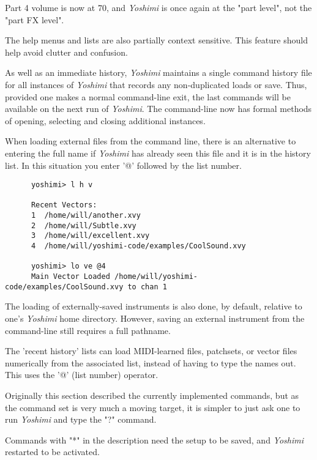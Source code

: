    Part 4 volume is now at 70, and \textsl{Yoshimi} is once again at the
   "part level", not the "part FX level".

   The help menus and lists are also partially context sensitive. This
   feature should help avoid clutter and confusion.

   As well as an immediate history, \textsl{Yoshimi} maintains a single command
   history file for all instances of \textsl{Yoshimi} that records any
   non-duplicated loads or save.  Thus, provided one makes a normal
   command-line exit, the last commands will be available on the next run of
   \textsl{Yoshimi}.
   The command-line now has formal methods of opening, selecting and closing
   additional instances.

   When loading external files from the command line, there is an alternative
   to entering the full name if \textsl{Yoshimi} has already seen this file and
   it is in the history list. In this situation you enter '@' followed by the
   list number.

   \begin{verbatim}
      yoshimi> l h v

      Recent Vectors:
      1  /home/will/another.xvy
      2  /home/will/Subtle.xvy
      3  /home/will/excellent.xvy
      4  /home/will/yoshimi-code/examples/CoolSound.xvy

      yoshimi> lo ve @4
      Main Vector Loaded /home/will/yoshimi-code/examples/CoolSound.xvy to chan 1
   \end{verbatim}

   The loading of externally-saved instruments is also done, by default,
   relative to one's \textsl{Yoshimi} home directory.  However, saving an
   external instrument from the command-line still requires a full pathname.

   The 'recent history' lists can load MIDI-learned files, patchsets, or
   vector files numerically from the associated list,
   instead of having to type the names out.
   This uses the '@' (list number) operator.

   Originally this section described the currently implemented commands,
   but as the command set is very much a moving target, it is simpler to just
   ask one to run \textsl{Yoshimi} and type the "?" command.

   Commands with "*" in the description need the setup to be saved,
   and \textsl{Yoshimi} restarted to be activated.

